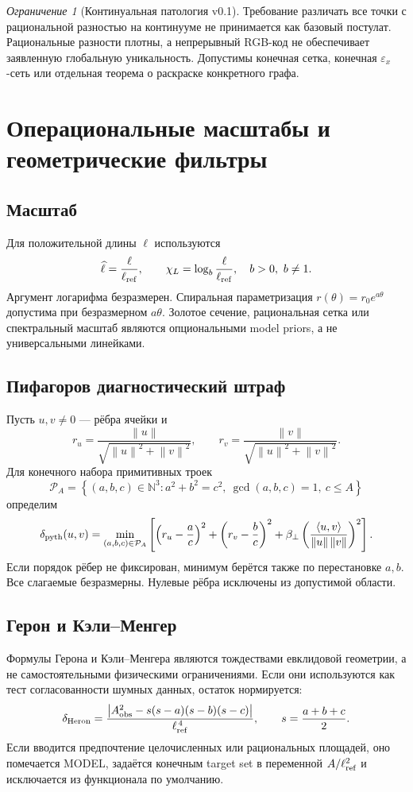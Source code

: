 \documentclass[11pt,a4paper]{article}
\theoremstyle{definition}
\theoremstyle{plain}
\theoremstyle{remark}
\newtheorem{warning}[definition]{Ограничение}
\newcommand{\N}{\mathbb{N}}
\newcommand{\norm}[1]{\left\lVert #1\right\rVert}
\newcommand{\abs}[1]{\left\lvert #1\right\rvert}
\newcommand{\set}[1]{\left\{#1\right\}}
\newcommand{\status}[1]{\textsf{\footnotesize #1}}
\begin{document}
\begin{warning}[Континуальная патология v0.1]
Требование различать все точки с рациональной разностью на континууме не
принимается как базовый постулат. Рациональные разности плотны, а
непрерывный RGB-код не обеспечивает заявленную глобальную уникальность.
Допустимы конечная сетка, конечная $\varepsilon_x$-сеть или отдельная
теорема о раскраске конкретного графа.
\end{warning}

\section{Операциональные масштабы и геометрические фильтры}

\subsection{Масштаб}

Для положительной длины $\ell$ используются
\[
\widehat\ell=\frac{\ell}{\ell_{\rm ref}},
\qquad
\chi_L=\log_b\frac{\ell}{\ell_{\rm ref}},
\quad b>0,\ b\ne1.
\]
Аргумент логарифма безразмерен. Спиральная параметризация
$r(\theta)=r_0e^{a\theta}$ допустима при безразмерном $a\theta$.
Золотое сечение, рациональная сетка или спектральный масштаб являются
опциональными model priors, а не универсальными линейками.

\subsection{Пифагоров диагностический штраф}

Пусть $u,v\ne0$ --- рёбра ячейки и
\[
r_u=\frac{\norm{u}}{\sqrt{\norm{u}^2+\norm{v}^2}},
\qquad
r_v=\frac{\norm{v}}{\sqrt{\norm{u}^2+\norm{v}^2}}.
\]
Для конечного набора примитивных троек
\[
\mathcal P_A=\set{(a,b,c)\in\N^3:
a^2+b^2=c^2,\ \gcd(a,b,c)=1,\ c\le A}
\]
определим
\[
\delta_{\rm pyth}(u,v)=
\min_{(a,b,c)\in\mathcal P_A}
\left[
\left(r_u-\frac ac\right)^2+
\left(r_v-\frac bc\right)^2+
\beta_{\perp}
\left(\frac{\langle u,v\rangle}{\norm{u}\norm{v}}\right)^2
\right].
\]
Если порядок рёбер не фиксирован, минимум берётся также по перестановке
$a,b$. Все слагаемые безразмерны. Нулевые рёбра исключены из допустимой
области.

\subsection{Герон и Кэли--Менгер}

Формулы Герона и Кэли--Менгера являются тождествами евклидовой геометрии,
а не самостоятельными физическими ограничениями. Если они используются
как тест согласованности шумных данных, остаток нормируется:
\[
\delta_{\rm Heron}
=\frac{\abs{A_{\rm obs}^2-s(s-a)(s-b)(s-c)}}{\ell_{\rm ref}^{\,4}},
\qquad
s=\frac{a+b+c}{2}.
\]
Если вводится предпочтение целочисленных или рациональных площадей, оно
помечается \status{MODEL}, задаётся конечным target set в переменной
$A/\ell_{\rm ref}^2$ и исключается из функционала по умолчанию.
\end{document}
